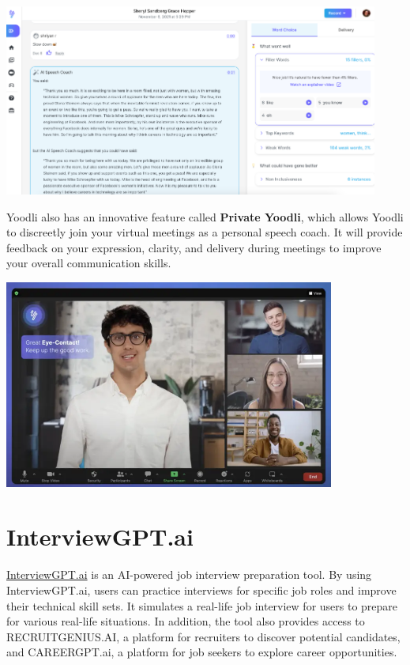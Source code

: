 \documentclass[
]{book}
\begin{document}
\includegraphics[width=4.85417in,height=\textheight]{yoodli pic 1.png}

Yoodli also has an innovative feature called \textbf{Private Yoodli}, which allows Yoodli to discreetly join your virtual meetings as a personal speech coach. It will provide feedback on your expression, clarity, and delivery during meetings to improve your overall communication skills.

\includegraphics[width=4.28125in,height=\textheight]{yoodli pic 2.png}

\hypertarget{interviewgpt.ai}{%
\section{InterviewGPT.ai}\label{interviewgpt.ai}}

\href{https://interviewgpt.ai/}{InterviewGPT.ai} is an AI-powered job interview preparation tool. By using InterviewGPT.ai, users can practice interviews for specific job roles and improve their technical skill sets. It simulates a real-life job interview for users to prepare for various real-life situations. In addition, the tool also provides access to RECRUITGENIUS.AI, a platform for recruiters to discover potential candidates, and CAREERGPT.ai, a platform for job seekers to explore career opportunities.
\end{document}
